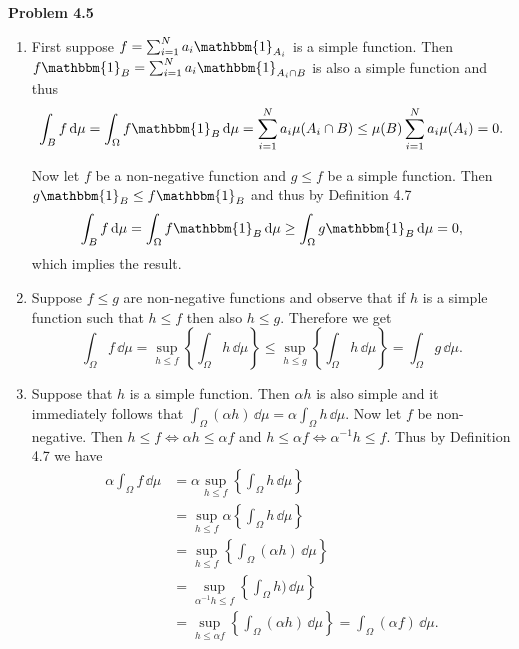 \documentclass{lecturenotes}
\begin{document}
\textbf{Problem 4.5}
\begin{enumerate}[label={(\alph*)}]
\item First suppose $f = \sum_{i = 1}^N a_i \mathbbm{1}_{A_i}$ is a simple function. Then $f \mathbbm{1}_B = \sum_{i = 1}^N a_i \mathbbm{1}_{A_i \cap B}$ is also a simple function and thus
\[
	\int_B f \, \dd \mu = \int_\Omega f \mathbbm{1}_B \, \dd \mu = \sum_{i = 1}^N a_i \mu(A_i \cap B) \le \mu(B) \sum_{i = 1}^N a_i \mu(A_i) = 0.
\]

Now let $f$ be a non-negative function and $g \le f$ be a simple function. Then $g \mathbbm{1}_B \le f \mathbbm{1}_B$ and thus by Definition 4.7
\begin{align*}
	\int_B f \, \dd \mu = \int_\Omega f \mathbbm{1}_B \, \dd \mu \ge \int_\Omega g \mathbbm{1}_B \, \dd \mu = 0,
\end{align*}
which implies the result.

\item Suppose $f \le g$ are non-negative functions and observe that if $h$ is a simple function such that $h \le f$ then also $h \le g$. Therefore we get
\[
	\int_\Omega f \, \dd \mu = \sup_{h \le f}\left\{\int_\Omega h \, \dd \mu\right\}
	\le \sup_{h \le g}\left\{\int_\Omega h \, \dd \mu\right\} = \int_\Omega g \, \dd \mu.
\]
\item Suppose that $h$ is a simple function. Then $\alpha h$ is also simple and it immediately follows that $\int_\Omega (\alpha h) \, \dd \mu = \alpha \int_\Omega h \, \dd \mu$. Now let $f$ be non-negative. Then $h \le f \iff \alpha h \le \alpha f$ and $h \le \alpha f \iff \alpha^{-1} h \le f$. Thus by Definition 4.7 we have
\begin{align*}
	\alpha \int_\Omega f \, \dd \mu &= \alpha \sup_{h \le f}\left\{\int_\Omega h \, \dd \mu\right\}\\
	&= \sup_{h \le f} \alpha \left\{\int_\Omega  h \, \dd \mu\right\}\\
	&= \sup_{h \le f} \left\{\int_\Omega (\alpha h) \, \dd \mu\right\}\\
	&= \sup_{\alpha^{-1} h \le f} \left\{\int_\Omega h) \, \dd \mu\right\}\\
	&= \sup_{h \le \alpha f} \left\{\int_\Omega (\alpha h) \, \dd \mu\right\} = \int_\Omega (\alpha f) \, \dd \mu.
\end{align*}
\end{enumerate}
\end{document}
